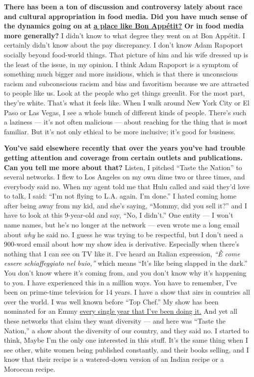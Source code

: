 \textbf{There has been a ton of discussion and controversy lately about
race and cultural appropriation in food media. Did you have much sense
of the dynamics going on at}
\textbf{\href{http://nytimes.com\#tooltip-3}{a place like Bon Appétit?}}
\textbf{Or in food media more generally?} I didn't know to what degree
they went on at Bon Appétit. I certainly didn't know about the pay
discrepancy. I don't know Adam Rapoport socially beyond food-world
things. That picture of him and his wife dressed up is the least of the
issue, in my opinion. I think Adam Rapoport is a symptom of something
much bigger and more insidious, which is that there is unconscious
racism and subconscious racism and bias and favoritism because we are
attracted to people like us. Look at the people who get things greenlit.
For the most part, they're white. That's what it feels like. When I walk
around New York City or El Paso or Las Vegas, I see a whole bunch of
different kinds of people. There's such a laziness --- it's not often
malicious --- about reaching for the thing that is most familiar. But
it's not only ethical to be more inclusive; it's good for business.

\textbf{You've said elsewhere recently that over the years you've had
trouble getting attention and coverage from certain outlets and
publications. Can you tell me more about that?} Listen, I pitched
``Taste the Nation'' to several networks. I flew to Los Angeles on my
own dime two or three times, and everybody said no. When my agent told
me that Hulu called and said they'd love to talk, I said: ``I'm not
flying to L.A. again. I'm done.'' I hated coming home after being away
from my kid, and she's saying, ``Mommy, did you sell it?'' and I have to
look at this 9-year-old and say, ``No, I didn't.'' One entity --- I
won't name names, but he's no longer at the network --- even wrote me a
long email about \emph{why} he said no. I guess he was trying to be
respectful, but I don't need a 900-word email about how my show idea is
derivative. Especially when there's nothing that I can see on TV like
it. I've heard an Italian expression, \emph{``È come essere
schiaffeggiato nel buio,''} which means ``It's like being slapped in the
dark.'' You don't know where it's coming from, and you don't know why
it's happening to you. I have experienced this in a million ways. You
have to remember, I've been on prime-time television for 14 years. I
have a show that airs in countries all over the world. I was well known
before ``Top Chef.'' My show has been nominated for an Emmy
\href{http://nytimes.com\#tooltip-4}{every single year that I've been
doing it.} And yet all these networks that claim they want diversity ---
and here was ``Taste the Nation,'' a show about the diversity of our
country, and they said no. I started to think, Maybe I'm the only one
interested in this stuff. It's the same thing when I see other, white
women being published constantly, and their books selling, and I know
that their recipe is a watered-down version of an Indian recipe or a
Moroccan recipe.

